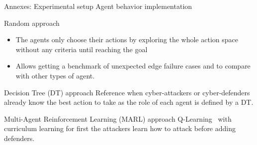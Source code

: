 	\begin{frame}{Annexes: Experimental setup}
		{Agent behavior implementation}

            \begin{block}{Random approach}
                \begin{itemize}
                    \item The agents only choose their actions by exploring the whole action space without any criteria until reaching the goal
                    \item Allows getting a benchmark of unexpected edge failure cases and to compare with other types of agent.
                \end{itemize}
            \end{block}

            \begin{block}{Decision Tree (DT) approach}
                Reference when cyber-attackers or cyber-defenders already know the best action to take as the role of each agent is defined by a DT.
            \end{block}

            \begin{block}{Multi-Agent Reinforcement Learning (MARL) approach}
                Q-Learning~\cite{CWatkins1992} with curriculum learning for first the attackers learn how to attack before adding defenders.
            \end{block}
 
	\end{frame}